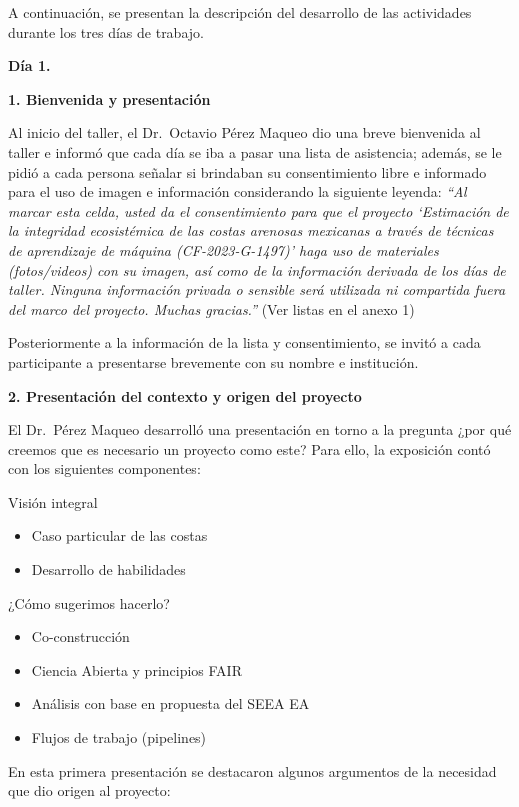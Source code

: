 \documentclass[
  letterpaper,
  DIV=11,
  numbers=noendperiod]{scrreprt}
\begin{document}
A continuación, se presentan la descripción del desarrollo de las
actividades durante los tres días de trabajo.

\textbf{Día 1.}

\textbf{1. Bienvenida y presentación}

Al inicio del taller, el Dr.~Octavio Pérez Maqueo dio una breve
bienvenida al taller e informó que cada día se iba a pasar una lista de
asistencia; además, se le pidió a cada persona señalar si brindaban su
consentimiento libre e informado para el uso de imagen e información
considerando la siguiente leyenda: \emph{``Al marcar esta celda, usted
da el consentimiento para que el proyecto `Estimación de la integridad
ecosistémica de las costas arenosas mexicanas a través de técnicas de
aprendizaje de máquina (CF-2023-G-1497)' haga uso de materiales
(fotos/videos) con su imagen, así como de la información derivada de los
días de taller. Ninguna información privada o sensible será utilizada ni
compartida fuera del marco del proyecto. Muchas gracias.''} (Ver listas
en el anexo 1)

Posteriormente a la información de la lista y consentimiento, se invitó
a cada participante a presentarse brevemente con su nombre e
institución.

\textbf{2. Presentación del contexto y origen del proyecto}

El Dr.~Pérez Maqueo desarrolló una presentación en torno a la pregunta
¿por qué creemos que es necesario un proyecto como este? Para ello, la
exposición contó con los siguientes componentes:

Visión integral

\begin{itemize}
\item
  Caso particular de las costas
\item
  Desarrollo de habilidades
\end{itemize}

¿Cómo sugerimos hacerlo?

\begin{itemize}
\item
  Co-construcción
\item
  Ciencia Abierta y principios FAIR
\item
  Análisis con base en propuesta del SEEA EA
\item
  Flujos de trabajo (pipelines)
\end{itemize}

En esta primera presentación se destacaron algunos argumentos de la
necesidad que dio origen al proyecto:
\end{document}
